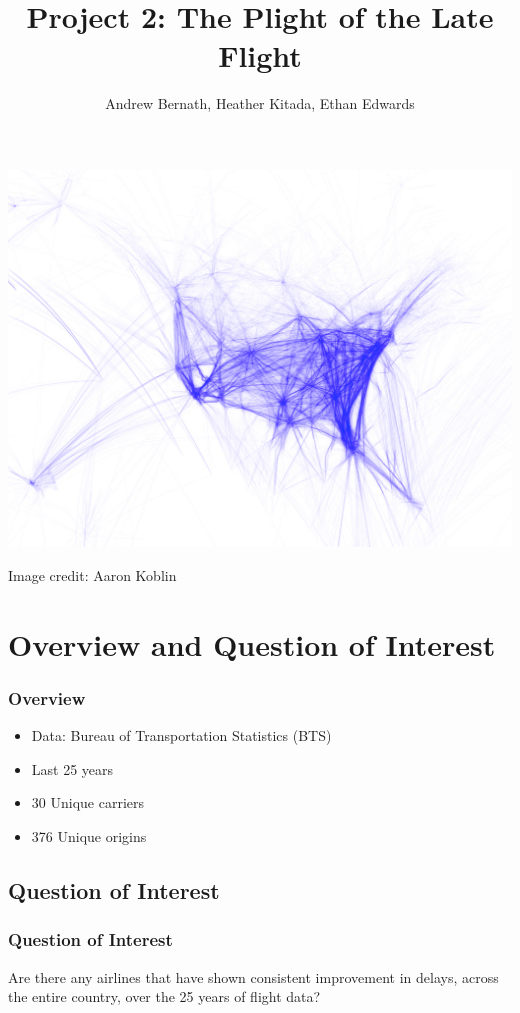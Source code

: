 \documentclass{beamer}
\title{Project 2: The Plight of the Late Flight}
\author{Andrew Bernath, Heather Kitada, Ethan Edwards}
\institute{Oregon State University}
\begin{document}
\begin{frame}
\titlepage
\end{frame}


\begin{frame}
\begin{center} 
\includegraphics[width=.9 \textwidth]{airtraffic}
\end{center}
\tiny{Image credit: Aaron Koblin}

\end{frame}

\begin{frame}{\contentsname}
\begin{multicols}{2}
\tableofcontents
\end{multicols}
\end{frame}

\section{Overview and Question of Interest}
\begin{frame}
\frametitle{Overview}
\begin{itemize}
\item Data: Bureau of Transportation Statistics (BTS)
\item Last 25 years 
\item 30 Unique carriers 
\item 376 Unique origins 
\end{itemize}

\end{frame}

\subsection{Question of Interest}
\begin{frame}
\frametitle{Question of Interest}

Are there any airlines that have shown consistent improvement in delays, across the entire country, over the 25 years of flight data?

\end{frame}
\end{document}
